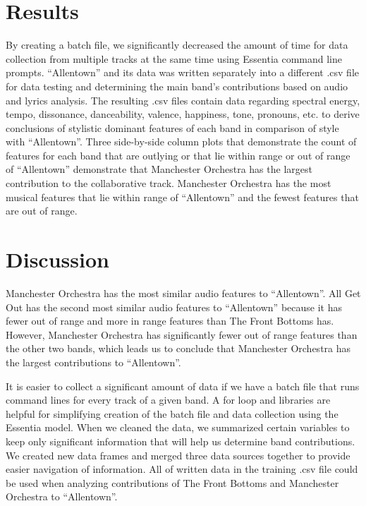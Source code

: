 \documentclass{article}\usepackage[]{graphicx}\usepackage[]{xcolor}
\begin{document}
\begin{multicols}{2}
\section{Results}
By creating a batch file, we significantly decreased the amount of time for data collection from multiple tracks at the same time using Essentia command line prompts. ``Allentown'' and its data was written separately into a different .csv file for data testing and determining the main band's contributions based on audio and lyrics analysis. The resulting .csv files contain data regarding spectral energy, tempo, dissonance, danceability, valence, happiness, tone, pronouns, etc. to derive conclusions of stylistic dominant features of each band in comparison of style with ``Allentown''. Three side-by-side column plots that demonstrate the count of features for each band that are outlying or that lie within range or out of range of ``Allentown'' demonstrate that Manchester Orchestra has the largest contribution to the collaborative track. Manchester Orchestra has the most musical features that lie within range of ``Allentown'' and the fewest features that are out of range. 

\section{Discussion}
Manchester Orchestra has the most similar audio features to ``Allentown''. All Get Out has the second most similar audio features to ``Allentown'' because it has fewer out of range and more in range features than The Front Bottoms has. However, Manchester Orchestra has significantly fewer out of range features than the other two bands, which leads us to conclude that Manchester Orchestra has the largest contributions to ``Allentown''.

It is easier to collect a significant amount of data if we have a batch file that runs command lines for every track of a given band. A for loop and libraries are helpful for simplifying creation of the batch file and data collection using the Essentia model. When we cleaned the data, we summarized certain variables to keep only significant information that will help us determine band contributions. We created new data frames and merged three data sources together to provide easier navigation of information. All of written data in the training .csv file could be used when analyzing contributions of The Front Bottoms and Manchester Orchestra to ``Allentown''.



\end{multicols}
\end{document}
